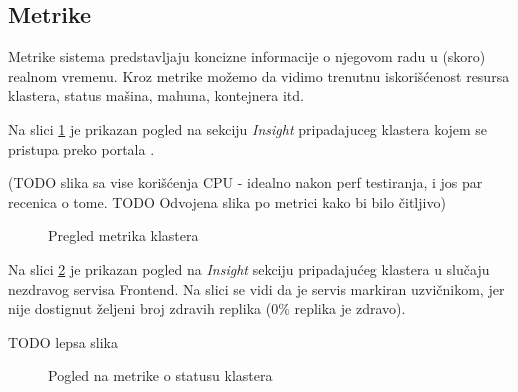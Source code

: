\documentclass[12pt,oneside]{memoir}
\begin{document}
\subsection{Metrike}

Metrike sistema predstavljaju koncizne informacije o njegovom radu u (skoro) realnom vremenu. Kroz metrike možemo da vidimo trenutnu iskorišćenost resursa klastera, status mašina, mahuna, kontejnera itd.

Na slici \ref{fig:aksinsights} je prikazan pogled na sekciju \emph{Insight} pripadajuceg klastera kojem se pristupa preko portala \cite{AzurePortal}. 

(TODO slika sa vise korišćenja CPU - idealno nakon perf testiranja, i jos par recenica o tome. TODO Odvojena slika po metrici kako bi bilo čitljivo)

\begin{figure}[!ht]
  \centering
  \caption{Pregled metrika klastera}
  \label{fig:aksinsights}
\end{figure}

Na slici \ref{fig:clusterunhealthy} je prikazan pogled na \emph{Insight} sekciju pripadajućeg klastera u slučaju nezdravog servisa Frontend. Na slici se vidi da je servis markiran uzvičnikom, jer nije dostignut željeni broj zdravih replika (0\% replika je zdravo).

TODO lepsa slika

\begin{figure}[!ht]
  \centering
  \caption{Pogled na metrike o statusu klastera}
  \label{fig:clusterunhealthy}
\end{figure}
\end{document}
